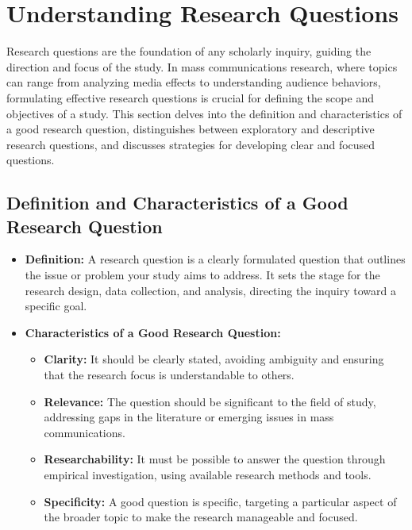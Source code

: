\documentclass[
]{book}
\providecommand{\tightlist}{%
  \setlength{\itemsep}{0pt}\setlength{\parskip}{0pt}}
\begin{document}
\hypertarget{understanding-research-questions}{%
\section{Understanding Research Questions}\label{understanding-research-questions}}

Research questions are the foundation of any scholarly inquiry, guiding the direction and focus of the study. In mass communications research, where topics can range from analyzing media effects to understanding audience behaviors, formulating effective research questions is crucial for defining the scope and objectives of a study. This section delves into the definition and characteristics of a good research question, distinguishes between exploratory and descriptive research questions, and discusses strategies for developing clear and focused questions.

\hypertarget{definition-and-characteristics-of-a-good-research-question}{%
\subsection*{Definition and Characteristics of a Good Research Question}\label{definition-and-characteristics-of-a-good-research-question}}

\begin{itemize}
\item
  \textbf{Definition:} A research question is a clearly formulated question that outlines the issue or problem your study aims to address. It sets the stage for the research design, data collection, and analysis, directing the inquiry toward a specific goal.
\item
  \textbf{Characteristics of a Good Research Question:}

  \begin{itemize}
  \tightlist
  \item
    \textbf{Clarity:} It should be clearly stated, avoiding ambiguity and ensuring that the research focus is understandable to others.
  \item
    \textbf{Relevance:} The question should be significant to the field of study, addressing gaps in the literature or emerging issues in mass communications.
  \item
    \textbf{Researchability:} It must be possible to answer the question through empirical investigation, using available research methods and tools.
  \item
    \textbf{Specificity:} A good question is specific, targeting a particular aspect of the broader topic to make the research manageable and focused.
  \end{itemize}
\end{itemize}
\end{document}
